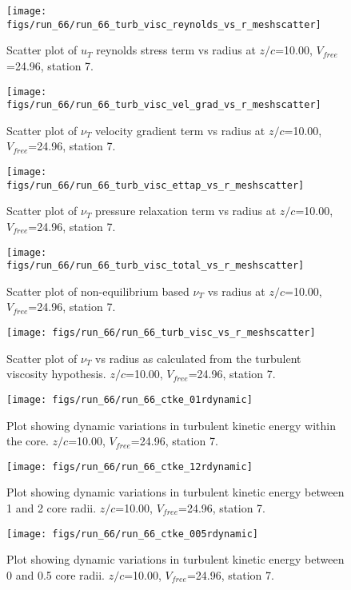 \begin{figure}[H]
\centering
\texttt{[image: figs/run\_66/run\_66\_turb\_visc\_reynolds\_vs\_r\_meshscatter]}
\caption{Scatter plot of $
u_T$ reynolds stress term vs radius at $z/c$=10.00, $V_{free}$=24.96, station 7.}
\end{figure}


\begin{figure}[H]
\centering
\texttt{[image: figs/run\_66/run\_66\_turb\_visc\_vel\_grad\_vs\_r\_meshscatter]}
\caption{Scatter plot of $\nu_T$ velocity gradient term vs radius at $z/c$=10.00, $V_{free}$=24.96, station 7.}
\end{figure}


\begin{figure}[H]
\centering
\texttt{[image: figs/run\_66/run\_66\_turb\_visc\_ettap\_vs\_r\_meshscatter]}
\caption{Scatter plot of $\nu_T$ pressure relaxation term vs radius at $z/c$=10.00, $V_{free}$=24.96, station 7.}
\end{figure}


\begin{figure}[H]
\centering
\texttt{[image: figs/run\_66/run\_66\_turb\_visc\_total\_vs\_r\_meshscatter]}
\caption{Scatter plot of non-equilibrium based $\nu_T$ vs radius at $z/c$=10.00, $V_{free}$=24.96, station 7.}
\end{figure}


\begin{figure}[H]
\centering
\texttt{[image: figs/run\_66/run\_66\_turb\_visc\_vs\_r\_meshscatter]}
\caption{Scatter plot of $\nu_T$ vs radius as calculated from the turbulent viscosity hypothesis. $z/c$=10.00, $V_{free}$=24.96, station 7.}
\end{figure}


\begin{figure}[H]
\centering
\texttt{[image: figs/run\_66/run\_66\_ctke\_01rdynamic]}
\caption{Plot showing dynamic variations in turbulent kinetic energy within the core. $z/c$=10.00, $V_{free}$=24.96, station 7.}
\end{figure}


\begin{figure}[H]
\centering
\texttt{[image: figs/run\_66/run\_66\_ctke\_12rdynamic]}
\caption{Plot showing dynamic variations in turbulent kinetic energy between 1 and 2 core radii. $z/c$=10.00, $V_{free}$=24.96, station 7.}
\end{figure}


\begin{figure}[H]
\centering
\texttt{[image: figs/run\_66/run\_66\_ctke\_005rdynamic]}
\caption{Plot showing dynamic variations in turbulent kinetic energy between 0 and 0.5 core radii. $z/c$=10.00, $V_{free}$=24.96, station 7.}
\end{figure}



